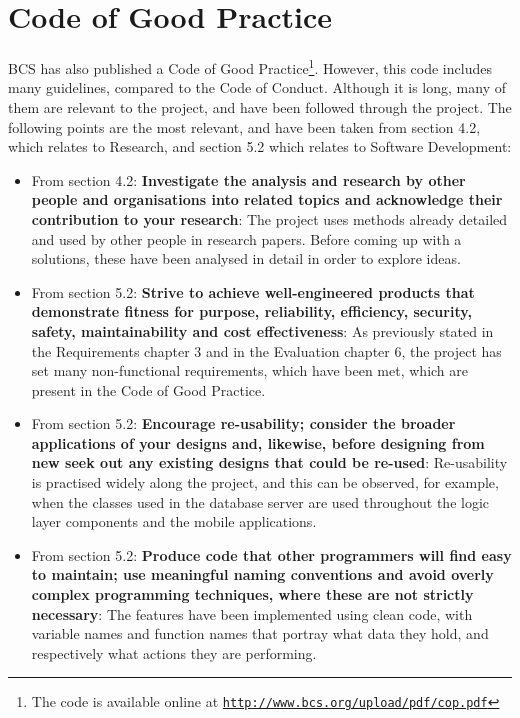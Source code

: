 \section{Code of Good Practice}
BCS has also published a Code of Good Practice\footnote{The code is available online at \texttt{\url{http://www.bcs.org/upload/pdf/cop.pdf}}}. However, this code includes many guidelines, compared to the Code of Conduct. Although it is long, many of them are relevant to the project, and have been followed through the project. The following points are the most relevant, and have been taken from section 4.2, which relates to Research, and section 5.2 which relates to Software Development:
\begin{itemize}
    \item From section 4.2: \textbf{Investigate the analysis and research by other people and organisations into related topics and acknowledge their contribution to your research}: The project uses methods already detailed and used by other people in research papers. Before coming up with a solutions, these have been analysed in detail in order to explore ideas.
    \item From section 5.2: \textbf{Strive to achieve well-engineered products that demonstrate fitness for purpose, reliability, efficiency, security, safety, maintainability and cost effectiveness}: As previously stated in the Requirements chapter 3 and in the Evaluation chapter 6, the project has set many non-functional requirements, which have been met, which are present in the Code of Good Practice.
    \item From section 5.2: \textbf{Encourage re-usability; consider the broader applications of your designs and, likewise, before designing from new seek out any existing designs that could be re-used}: Re-usability is practised widely along the project, and this can be observed, for example, when the classes used in the database server are used throughout the logic layer components and the mobile applications.
    \item From section 5.2: \textbf{Produce code that other programmers will find easy to maintain; use meaningful naming conventions and avoid overly complex programming techniques, where these are not strictly necessary}: The features have been implemented using clean code, with variable names and function names that portray what data they hold, and respectively what actions they are performing.
\end{itemize}

